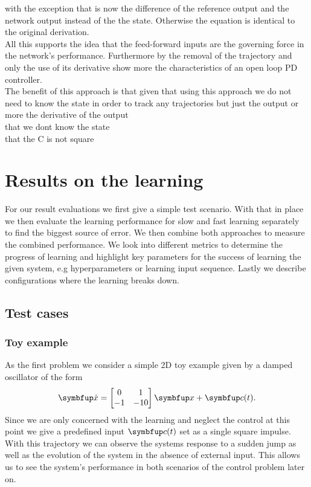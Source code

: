 with the exception that is now the difference of the reference output and the network output instead of the the state. Otherwise the equation is identical to the original derivation. \\

All this supports the idea that the feed-forward inputs are the governing force in the network's performance. Furthermore by the removal of the trajectory and only the use of its derivative show more the characteristics of an open loop PD controller.\\
The benefit of this approach is that given that using this approach we do not need to know the state in order to track any trajectories but just the output or more the derivative of the output\\
that we dont know the state\\
that the C is not square


\section{Results on the learning}


For our result evaluations we first give a simple test scenario. With that in place we then evaluate the learning performance for slow and fast learning separately to find the biggest source of error. We then combine both approaches to measure the combined performance. We look into different metrics to determine the progress of learning and highlight key parameters for the success of learning the given system, e.g hyperparameters or learning input sequence. Lastly we describe configurations where the learning breaks down.\\


\subsection{Test cases}
\subsubsection{Toy example}
As the first problem we consider a simple 2D toy example given by a damped oscillator of the form
\begin{equation}\label{eq:toy_example}
	\bmu{\dot{x}} = \begin{bmatrix}
	0&1\\ -1 &-10
	\end{bmatrix}\bmu{x} + \bmu{c}(t).
\end{equation}
Since we are only concerned with the learning and neglect the control at this point we give a predefined input $\bmu{c}(t)$ set as a single square impulse. With this trajectory we can observe the systems response to a sudden jump as well as the evolution of the system in the absence of external input. This allows us to see the system's performance in both scenarios of the control problem later on.

